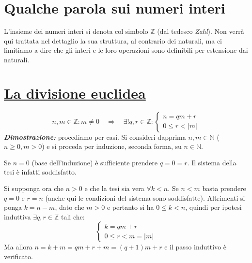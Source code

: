 
\section{Qualche parola sui numeri interi}
L'insieme dei numeri interi si denota col simbolo $\mathbb{Z}$
(dal tedesco \textit{Zahl}). Non verrà qui trattata nel dettaglio
la sua struttura, al contrario dei naturali, ma ci limitiamo a
dire che gli interi e le loro operazioni sono definibili per
estensione dai naturali.

\section{\underline{La divisione euclidea}}
\begin{tcolorbox}[enhanced, breakable, title={Teorema della divisione euclidea}]
\[
    n,m \in \mathbb{Z}: m\not=0 \quad \Longrightarrow \quad \exists! q,r\in \mathbb{Z}:
    \begin{cases}
        n = qm + r\\
        0 \leq r < |m|
    \end{cases}
\]
\emph{\textbf{Dimostrazione:}}  procediamo
per casi. Si consideri dapprima $n,m \in \mathbb{N}$ ($n \geq 0, m > 0$)
e si proceda per induzione, seconda forma, su $n\in\mathbb{N}$.

Se $n = 0$ (base dell'induzione) è sufficiente prendere $q = 0 = r$. Il
sistema della tesi è infatti soddisfatto.

Si supponga ora che $n > 0$ e che la tesi sia vera $\forall k < n$.
Se $n < m$ basta prendere $q = 0$ e $r = n$ (anche qui le condizioni
del sistema sono soddisfatte). Altrimenti si ponga $k = n - m$, dato
che $m > 0$ e pertanto si ha $0 \leq k < n$,
quindi per ipotesi induttiva $\exists q,r \in \mathbb{Z}$ tali che:
\[ 
    \begin{cases}
        k = qm + r\\
        0 \leq r < m = |m|
    \end{cases}
\]
Ma allora $n = k + m = qm + r + m = (q+1)m + r$ e il passo induttivo
è verificato.


\end{tcolorbox}
